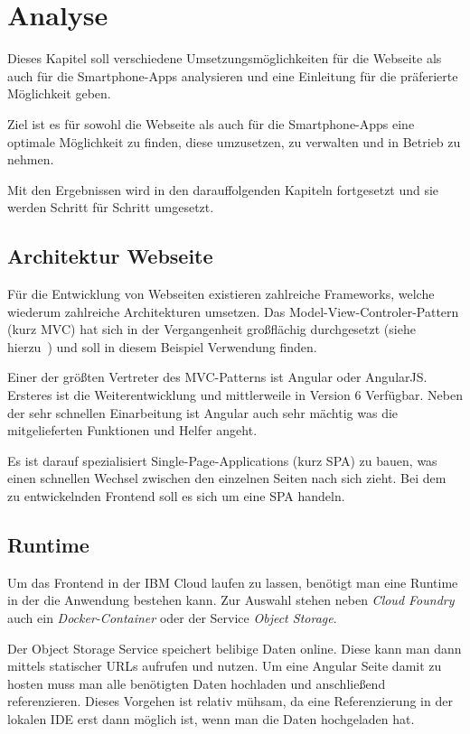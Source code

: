 \section{Analyse}
Dieses Kapitel soll verschiedene Umsetzungsmöglichkeiten für die Webseite als auch für die Smartphone-Apps analysieren
und eine Einleitung für die präferierte Möglichkeit geben.

Ziel ist es für sowohl die Webseite als auch für die Smartphone-Apps eine optimale Möglichkeit zu finden, diese
umzusetzen, zu verwalten und in Betrieb zu nehmen.

Mit den Ergebnissen wird in den darauffolgenden Kapiteln fortgesetzt und sie werden Schritt für Schritt umgesetzt.

\subsection{Architektur Webseite}
Für die Entwicklung von Webseiten existieren zahlreiche Frameworks, welche wiederum zahlreiche Architekturen umsetzen.
Das Model-View-Controler-Pattern (kurz MVC) hat sich in der Vergangenheit großflächig durchgesetzt (siehe
hierzu~\cite{book_grundlagen_mvc}) und soll in diesem Beispiel Verwendung finden.

Einer der größten Vertreter des MVC-Patterns ist Angular oder AngularJS. Ersteres ist die Weiterentwicklung und
mittlerweile in Version 6 Verfügbar. Neben der sehr schnellen Einarbeitung ist Angular auch sehr
mächtig was die mitgelieferten Funktionen und Helfer angeht.

Es ist darauf spezialisiert Single-Page-Applications (kurz SPA) zu bauen, was einen schnellen Wechsel zwischen den
einzelnen Seiten nach sich zieht. Bei dem zu entwickelnden Frontend soll es sich um eine SPA handeln.

\subsection{Runtime}
Um das Frontend in der IBM Cloud laufen zu lassen, benötigt man eine Runtime in der die Anwendung bestehen kann. Zur
Auswahl stehen neben \textit{Cloud Foundry} auch ein \textit{Docker-Container} oder der Service \textit{Object Storage}.

Der Object Storage Service speichert belibige Daten online. Diese kann man dann mittels statischer URLs aufrufen und
nutzen. Um eine Angular Seite damit zu hosten muss man alle benötigten Daten hochladen und anschließend referenzieren.
Dieses Vorgehen ist relativ mühsam, da eine Referenzierung in der lokalen IDE erst dann möglich ist, wenn man die Daten
hochgeladen hat.

